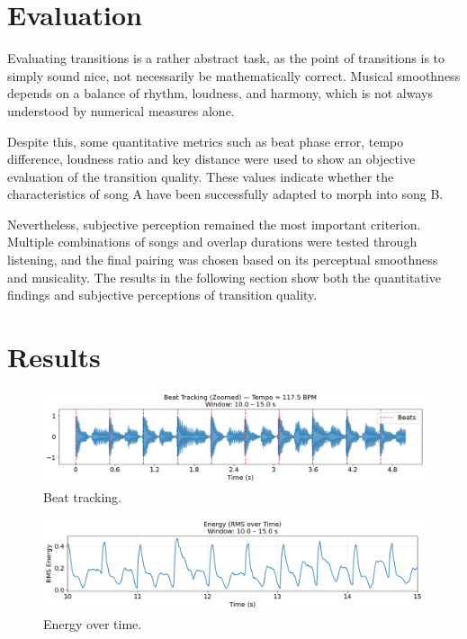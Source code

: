 \documentclass[14pt]{extarticle}
\begin{document}
\section{Evaluation}

Evaluating transitions is a rather abstract task, as the point of transitions is to simply sound nice, not necessarily be mathematically correct. Musical smoothness depends on a balance of rhythm, loudness, and harmony, which is not always understood by numerical measures alone.

Despite this, some quantitative metrics such as beat phase error, tempo difference, loudness ratio and key distance were used to show an objective evaluation of the transition quality. These values indicate whether the characteristics of song A have been successfully adapted to morph into song B.

Nevertheless, subjective perception remained the most important criterion. Multiple combinations of songs and overlap durations were tested through listening, and the final pairing was chosen based on its perceptual smoothness and musicality. The results in the following section show both the quantitative findings and subjective perceptions of transition quality.




\section{Results}

\begin{figure}[H]
    \centering
    \includegraphics[width=\textwidth]{figures/beat_tracking.png}
    \caption{Beat tracking.}
\end{figure}

\begin{figure}[H]
    \centering
    \includegraphics[width=\textwidth]{figures/energy.png}
    \caption{Energy over time.}
\end{figure}
\end{document}
